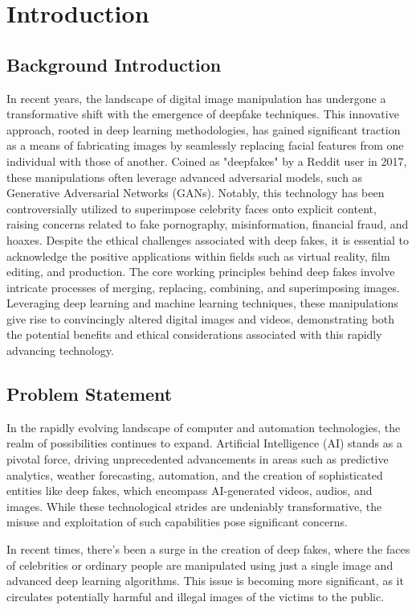      \chapter{Introduction}
        \section{Background Introduction}
        In recent years, the landscape of digital image manipulation has undergone a transformative shift with the emergence of deepfake techniques. This innovative approach, rooted in deep learning methodologies, has gained significant traction as a means of fabricating images by seamlessly replacing facial features from one individual with those of another. Coined as "deepfakes" by a Reddit user in 2017, these manipulations often leverage advanced adversarial models, such as Generative Adversarial Networks (GANs). Notably, this technology has been controversially utilized to superimpose celebrity faces onto explicit content, raising concerns related to fake pornography, misinformation, financial fraud, and hoaxes.
        Despite the ethical challenges associated with deep fakes, it is essential to acknowledge the positive applications within fields such as virtual reality, film editing, and production. The core working principles behind deep fakes involve intricate processes of merging, replacing, combining, and superimposing images. Leveraging deep learning and machine learning techniques, these manipulations give rise to convincingly altered digital images and videos, demonstrating both the potential benefits and ethical considerations associated with this rapidly advancing technology.
        \section{Problem Statement}
        In the rapidly evolving landscape of computer and automation technologies, the realm of possibilities continues to expand. Artificial Intelligence (AI) stands as a pivotal force, driving unprecedented advancements in areas such as predictive analytics, weather forecasting, automation, and the creation of sophisticated entities like deep fakes, which encompass AI-generated videos, audios, and images. While these technological strides are undeniably transformative, the misuse and exploitation of such capabilities pose significant concerns. 

        In recent times, there's been a surge in the creation of deep fakes, where the faces of celebrities or ordinary people are manipulated using just a single image and advanced deep learning algorithms. This issue is becoming more significant, as it circulates potentially harmful and illegal images of the victims to the public.

